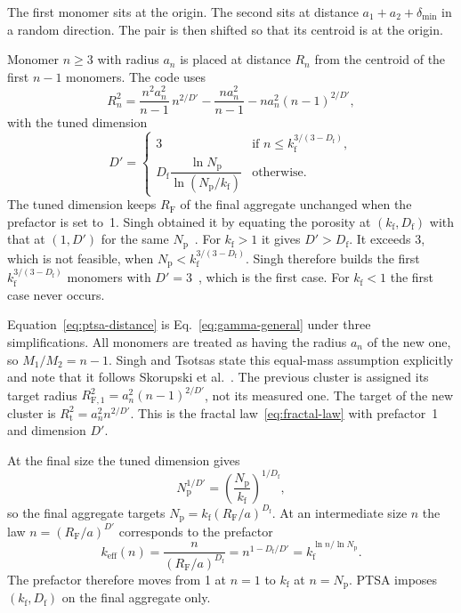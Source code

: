 \documentclass[11pt,a4paper]{article}
\newcommand{\Df}{D_\text{f}}
\newcommand{\kf}{k_\text{f}}
\newcommand{\RF}{R_\text{F}}
\newcommand{\dmin}{\delta_\text{min}}
\begin{document}
The first monomer sits at the origin.
The second sits at distance $a_1 + a_2 + \dmin$ in a random direction.
The pair is then shifted so that its centroid is at the origin.

Monomer $n \ge 3$ with radius $a_n$ is placed at distance $R_n$ from the centroid of the first $n-1$ monomers.
The code uses
\begin{equation}
  R_n^2 = \frac{n^2 a_n^2}{n-1}\, n^{2/D'}
        - \frac{n a_n^2}{n-1}
        - n a_n^2 (n-1)^{2/D'} ,
  \label{eq:ptsa-distance}
\end{equation}
with the tuned dimension
\begin{equation}
  D' =
  \begin{cases}
    3 & \text{if } n \le \kf^{3/(3-\Df)}, \\[2pt]
    \Df \dfrac{\ln N_\text{p}}{\ln(N_\text{p}/\kf)} & \text{otherwise}.
  \end{cases}
  \label{eq:ptsa-tuned-dimension}
\end{equation}
The tuned dimension keeps $\RF$ of the final aggregate unchanged when the prefactor is set to~1.
Singh obtained it by equating the porosity at $(\kf, \Df)$ with that at $(1, D')$ for the same $N_\text{p}$~\cite{singh2021thesis}.
For $\kf > 1$ it gives $D' > \Df$.
It exceeds 3, which is not feasible, when $N_\text{p} < \kf^{3/(3-\Df)}$.
Singh therefore builds the first $\kf^{3/(3-\Df)}$ monomers with $D' = 3$~\cite{singh2021thesis}, which is the first case.
For $\kf < 1$ the first case never occurs.

Equation~\eqref{eq:ptsa-distance} is Eq.~\eqref{eq:gamma-general} under three simplifications.
All monomers are treated as having the radius $a_n$ of the new one, so $M_1/M_2 = n-1$.
Singh and Tsotsas state this equal-mass assumption explicitly and note that it follows Skorupski et al.~\cite{skorupski2014}.
The previous cluster is assigned its target radius $R_{\text{F},1}^2 = a_n^2 (n-1)^{2/D'}$, not its measured one.
The target of the new cluster is $R_\text{t}^2 = a_n^2 n^{2/D'}$.
This is the fractal law~\eqref{eq:fractal-law} with prefactor~1 and dimension $D'$.

At the final size the tuned dimension gives
\begin{equation}
  N_\text{p}^{1/D'} = \left( \frac{N_\text{p}}{\kf} \right)^{1/\Df} ,
  \label{eq:ptsa-final}
\end{equation}
so the final aggregate targets $N_\text{p} = \kf (\RF/a)^{\Df}$.
At an intermediate size $n$ the law $n = (\RF/a)^{D'}$ corresponds to the prefactor
\begin{equation}
  k_\text{eff}(n) = \frac{n}{(\RF/a)^{\Df}} = n^{1 - \Df/D'} = \kf^{\ln n / \ln N_\text{p}} .
  \label{eq:ptsa-local-prefactor}
\end{equation}
The prefactor therefore moves from 1 at $n = 1$ to $\kf$ at $n = N_\text{p}$.
PTSA imposes $(\kf, \Df)$ on the final aggregate only.
\end{document}
